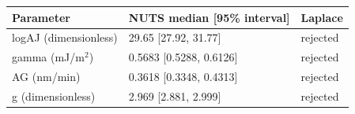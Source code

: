 \begin{tabular}{lll}
Parameter & NUTS median [95\% interval] & Laplace \\
\hline
logAJ (dimensionless) & 29.65 [27.92, 31.77] & rejected \\
gamma (mJ/m$^2$) & 0.5683 [0.5288, 0.6126] & rejected \\
AG (nm/min) & 0.3618 [0.3348, 0.4313] & rejected \\
g (dimensionless) & 2.969 [2.881, 2.999] & rejected \\
\end{tabular}

